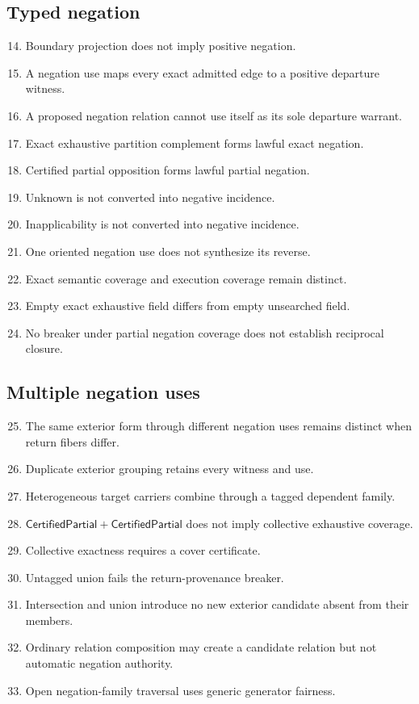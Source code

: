 \documentclass[11pt,oneside]{article}
\begin{document}
\subsection{Typed negation}
\begin{enumerate}\setcounter{enumi}{13}
\item Boundary projection does not imply positive negation.
\item A negation use maps every exact admitted edge to a positive departure witness.
\item A proposed negation relation cannot use itself as its sole departure warrant.
\item Exact exhaustive partition complement forms lawful exact negation.
\item Certified partial opposition forms lawful partial negation.
\item Unknown is not converted into negative incidence.
\item Inapplicability is not converted into negative incidence.
\item One oriented negation use does not synthesize its reverse.
\item Exact semantic coverage and execution coverage remain distinct.
\item Empty exact exhaustive field differs from empty unsearched field.
\item No breaker under partial negation coverage does not establish reciprocal closure.
\end{enumerate}

\subsection{Multiple negation uses}
\begin{enumerate}\setcounter{enumi}{24}
\item The same exterior form through different negation uses remains distinct when return fibers differ.
\item Duplicate exterior grouping retains every witness and use.
\item Heterogeneous target carriers combine through a tagged dependent family.
\item \(\mathsf{CertifiedPartial}+\mathsf{CertifiedPartial}\) does not imply collective exhaustive coverage.
\item Collective exactness requires a cover certificate.
\item Untagged union fails the return-provenance breaker.
\item Intersection and union introduce no new exterior candidate absent from their members.
\item Ordinary relation composition may create a candidate relation but not automatic negation authority.
\item Open negation-family traversal uses generic generator fairness.
\end{enumerate}
\end{document}
